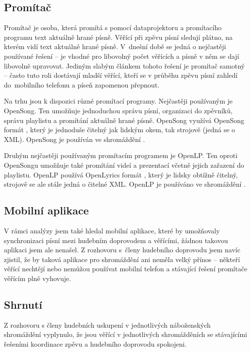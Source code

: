 \subsection{Promítač}

Promítač je osoba, která promítá s pomocí dataprojektoru a promítacího programu text aktuálně hrané písně. Věřící při zpěvu písní sledují plátno, na kterém vidí text aktuálně hrané písně. V~dnešní době se jedná o nejčastěji používané řešení -- je vhodné pro libovolný počet věřících a písně v něm se dají libovolně upravovat. Jediným slabým článkem tohoto řešení je promítač samotný -- často tuto roli dostávají mladší věřící, kteří se v průběhu zpěvu písní zahledí do~mobilního telefonu a píseň zapomenou přepnout.

Na trhu jsou k dispozici různé promítací programy. Nejčastěji používaným je OpenSong. Ten umožňuje jednoduchou správu písní, organizaci do zpěvníků, správu playlistu a promítání aktuálně hrané písně. OpenSong využívá OpenSong formát \cite{open-song-format}, který je jednoduše čitelný jak lidským okem, tak strojově (jedná se o XML). OpenSong je používán ve shromáždění .

Druhým nejčastěji používaným promítacím programem je OpenLP. Ten oproti OpenSongu umožňuje také promítání videí a prezentací včetně jejich zařazení do playlistu. OpenLP používá OpenLyrics formát \cite{open-lyrics-format}, který je lidsky obtížně čitelný, strojově se ale stále jedná o čitelné XML. OpenLP je používáno ve shromáždění .

\subsection{Mobilní aplikace}

V rámci analýzy jsem také hledal mobilní aplikace, které by umožňovaly synchronizaci písní mezi hudebním doprovodem a věřícími, žádnou takovou aplikaci jsem ale nenašel. Z rozhovoru s~členy hudebního doprovodu jsem navíc zjistil, že by taková aplikace pro shromáždění ani neměla velký přínos -- někteří věřící nechtějí nebo nemůžou používat mobilní telefon a stávající řešení promítače věřícím plně vyhovuje.

\subsection{Shrnutí}

Z rozhovoru s členy hudebních uskupení v jednotlivých náboženských shromáždění vyplynulo, že jsou věřící v jednotlivých shromážděních se stávajícími řešeními koordinace zpěvu a hudebního doprovodu  spokojeni.

